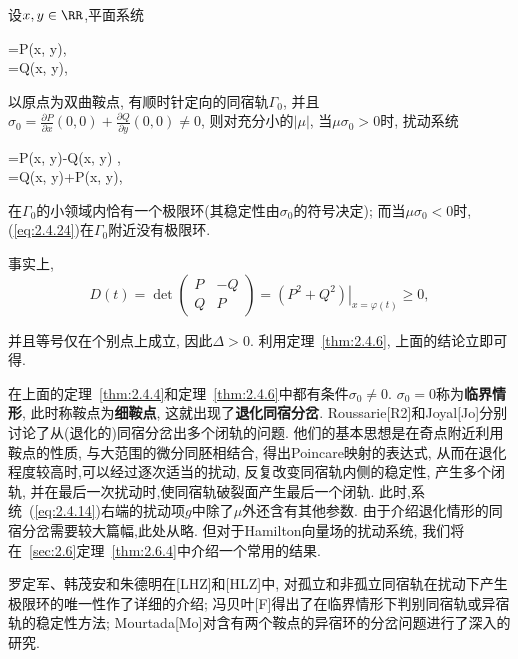 \begin{example}
  \label{exam:2.4.7}
  设$x,y\in \RR$,平面系统
  \begin{ode*}
    {=P(x, y)}, \\
    {=Q(x, y)},
  \end{ode*}
  以原点为双曲鞍点,
  有顺时针定向的同宿轨$\Gamma_0$,
  并且$\sigma_{0}=\frac{\partial P}{\partial x}(0,0)+\frac{\partial Q}{\partial y}(0,0) \neq 0$,
  则对充分小的$|\mu|$,
  当$\mu\sigma_0>0$时,
  扰动系统
  \begin{ode}
    \label{eq:2.4.24}
    {=P(x, y)-\mu Q(x, y)} ,\\
    {=Q(x, y)+\mu P(x, y)},
  \end{ode}
  在$\Gamma_0$的小领域内恰有一个极限环(其稳定性由$\sigma_0$的符号决定);
  而当$\mu\sigma_0<0$时,
  (\ref{eq:2.4.24})在$\Gamma_0$附近没有极限环.
  \par
  事实上,
$$
D(t)=\operatorname{det}\left(\begin{array}{cc}{P} & {-Q} \\ {Q} & {P}\end{array}\right)=\left.\left(P^{2}+Q^{2}\right)\right|_{x=\varphi(t)} \geqslant 0,
$$

并且等号仅在个别点上成立,
因此$\Delta>0$.
利用定理~\ref{thm:2.4.6},
上面的结论立即可得.
\end{example}

\begin{collory}
  \label{col:2.4.8}
  在上面的定理~\ref{thm:2.4.4}和定理~\ref{thm:2.4.6}中都有条件$\sigma_0\neq 0$.
  $\sigma_0=0$称为\textbf{临界情形},
  此时称鞍点为\textbf{细鞍点},
  这就出现了\textbf{退化同宿分岔}.
  Roussarie[R2]和Joyal[Jo]分别讨论了从(退化的)同宿分岔出多个闭轨的问题.
  他们的基本思想是在奇点附近利用鞍点的性质,
  与大范围的微分同胚相结合,
  得出Poincare映射的表达式,
  从而在退化程度较高时,可以经过逐次适当的扰动,
  反复改变同宿轨内侧的稳定性,
  产生多个闭轨,
  并在最后一次扰动时,使同宿轨破裂面产生最后一个闭轨.
  此时,系统~(\ref{eq:2.4.14})右端的扰动项$g$中除了$\mu$外还含有其他参数.
  由于介绍退化情形的同宿分岔需要较大篇幅,此处从略.
  但对于Hamilton向量场的扰动系统,
  我们将在~\ref{sec:2.6}定理~\ref{thm:2.6.4}中介绍一个常用的结果.
  \par
  罗定军、韩茂安和朱德明在[LHZ]和[HLZ]中,
  对孤立和非孤立同宿轨在扰动下产生极限环的唯一性作了详细的介绍;
  冯贝叶[F]得出了在临界情形下判别同宿轨或异宿轨的稳定性方法;
  Mourtada[Mo]对含有两个鞍点的异宿环的分岔问题进行了深入的研究.
\end{collory}

